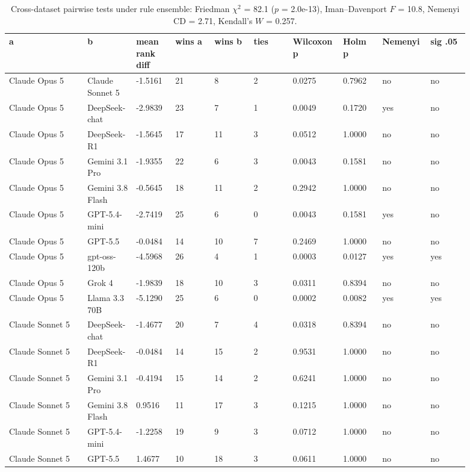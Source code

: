 \begin{landscape}
\tiny
\setlength{\tabcolsep}{3pt}
\begin{longtable}{p{0.162\linewidth}p{0.081\linewidth}p{0.081\linewidth}p{0.081\linewidth}p{0.081\linewidth}p{0.081\linewidth}p{0.081\linewidth}p{0.081\linewidth}p{0.081\linewidth}p{0.081\linewidth}}
\caption{Cross-dataset pairwise tests under rule ensemble: Friedman $\chi^2$ = 82.1 ($p$ = 2.0e-13), Iman--Davenport $F$ = 10.8, Nemenyi CD = 2.71, Kendall's $W$ = 0.257.}\label{tab:pairwise_ensemble}\\
\toprule
a & b & mean rank diff & wins a & wins b & ties & Wilcoxon p & Holm p & Nemenyi & sig .05 \\
\midrule
Claude Opus 5 & Claude Sonnet 5 & -1.5161 & 21 & 8 & 2 & 0.0275 & 0.7962 & no & no \\
Claude Opus 5 & DeepSeek-chat & -2.9839 & 23 & 7 & 1 & 0.0049 & 0.1720 & yes & no \\
Claude Opus 5 & DeepSeek-R1 & -1.5645 & 17 & 11 & 3 & 0.0512 & 1.0000 & no & no \\
Claude Opus 5 & Gemini 3.1 Pro & -1.9355 & 22 & 6 & 3 & 0.0043 & 0.1581 & no & no \\
Claude Opus 5 & Gemini 3.8 Flash & -0.5645 & 18 & 11 & 2 & 0.2942 & 1.0000 & no & no \\
Claude Opus 5 & GPT-5.4-mini & -2.7419 & 25 & 6 & 0 & 0.0043 & 0.1581 & yes & no \\
Claude Opus 5 & GPT-5.5 & -0.0484 & 14 & 10 & 7 & 0.2469 & 1.0000 & no & no \\
Claude Opus 5 & gpt-oss-120b & -4.5968 & 26 & 4 & 1 & 0.0003 & 0.0127 & yes & yes \\
Claude Opus 5 & Grok 4 & -1.9839 & 18 & 10 & 3 & 0.0311 & 0.8394 & no & no \\
Claude Opus 5 & Llama 3.3 70B & -5.1290 & 25 & 6 & 0 & 0.0002 & 0.0082 & yes & yes \\
Claude Sonnet 5 & DeepSeek-chat & -1.4677 & 20 & 7 & 4 & 0.0318 & 0.8394 & no & no \\
Claude Sonnet 5 & DeepSeek-R1 & -0.0484 & 14 & 15 & 2 & 0.9531 & 1.0000 & no & no \\
Claude Sonnet 5 & Gemini 3.1 Pro & -0.4194 & 15 & 14 & 2 & 0.6241 & 1.0000 & no & no \\
Claude Sonnet 5 & Gemini 3.8 Flash & 0.9516 & 11 & 17 & 3 & 0.1215 & 1.0000 & no & no \\
Claude Sonnet 5 & GPT-5.4-mini & -1.2258 & 19 & 9 & 3 & 0.0712 & 1.0000 & no & no \\
Claude Sonnet 5 & GPT-5.5 & 1.4677 & 10 & 18 & 3 & 0.0611 & 1.0000 & no & no \\

\end{longtable}
\end{landscape}
